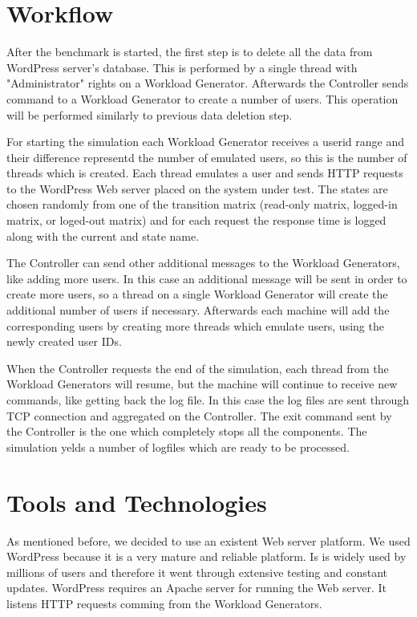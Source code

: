 \section{Workflow}
\label{sec:workflow}

After the benchmark is started, the first step is to delete all the data from WordPress server's database. This is performed by a single thread with "Administrator" rights on a Workload Generator. Afterwards the Controller sends command to a Workload Generator to create a number of users. This operation will be performed similarly to previous data deletion step. 

For starting the simulation each Workload Generator receives a userid range and their difference representd the number of emulated users, so this is the number of threads which is created. Each thread emulates a user and sends HTTP requests to the WordPress Web server placed on the system under test. The states are chosen randomly from one of the transition matrix (read-only matrix, logged-in matrix, or loged-out matrix) and for each request the response time is logged along with the current and state name. 

The Controller can send other additional messages to the Workload Generators, like adding more users. In this case an additional message will be sent in order to create more users, so a thread on a single Workload Generator will create the additional number of users if necessary. Afterwards each machine will add the corresponding users by creating more threads which emulate users, using the newly created user IDs. 

When the Controller requests the end of the simulation, each thread from the Workload Generators will resume, but the machine will continue to receive new commands, like getting back the log file. In this case the log files are sent through TCP connection and aggregated on the Controller. The exit command sent by the Controller is the one which completely stops all the components. The simulation yelds a number of logfiles which are ready to be processed.

\section{Tools and Technologies}
\label{sec:tools-and-technologies}

As mentioned before, we decided to use an existent Web server platform. We used WordPress because it is a very mature and reliable platform. Is is widely used by millions of users and therefore it went through extensive testing and constant updates. WordPress requires an Apache server for running the Web server. It listens HTTP requests comming from the Workload Generators. 

